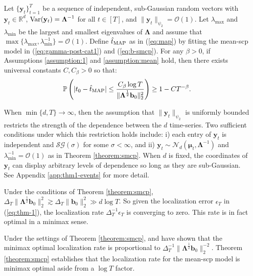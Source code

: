 \begin{theorem}\label{theorem:smcp}
    Let $\{\mathbf{y}_t\}_{t=1}^T$ be a sequence of independent, sub-Gaussian random vectors with $\mathbf{y}_t \in \mathbb{R}^d$, $\normalfont{\Var}(\mathbf{y}_t) = \boldsymbol{\Lambda}^{-1}$ for all $t \in [T]$, and $\lVert \mathbf{y}_t\rVert_{\psi_2} =\mathcal{O}(1)$. Let $\lambda_{\max}$ and $\lambda_{\min}$ be the largest and smallest eigenvalues of $\boldsymbol{\Lambda}$ and assume that $\max\{\lambda_{\max}, \lambda^{-1}_{\min}\} = \mathcal{O}(1)$. Define $\hat{t}_{\normalfont \text{MAP}}$ as in (\ref{eq:map}) by fitting the mean-scp model in (\ref{eq:gamma-post-cat1}) and (\ref{eq:b-smcp}). For any $\beta > 0$, if Assumptions \ref{assumption:1} and \ref{assumption:mean} hold, then there exists universal constants $C,C_\beta > 0$ so that:
    \vspace{-5pt}
    \begin{align}
        \Pr\left(|t_0 - \hat{t}_{\normalfont \text{MAP}}| \leq \frac{C_\beta \log T}{\lVert\boldsymbol{\Lambda}^{\frac{1}{2}}\mathbf{b}_0\rVert_2^2}\right) \geq 1-CT^{-\beta}. \label{eq:thm-1}
    \end{align}
\end{theorem}
\vspace{-5pt}

\begin{remark}\label{rmk:sub-g}
    When $\min\{d,T\}\to\infty$, then the assumption that $\lVert \mathbf{y}_t\rVert_{\psi_2}$ is uniformly bounded restricts the strength of the dependence between the $d$ time-series. Two sufficient conditions under which this restriction holds include: i) each entry of $\mathbf{y}_t$ is independent and $\mathcal{SG}(\sigma)$ for some $\sigma < \infty$, and ii) $\mathbf{y}_t \sim \mathcal{N}_d(\boldsymbol{\mu}_t, \boldsymbol{\Lambda}^{-1})$ and $\lambda^{-1}_{\min} = \mathcal{O}(1)$ as in Theorem \ref{theorem:smcp}. When $d$ is fixed, the coordinates of $\mathbf{y}_t$ can display arbitrary levels of dependence so long as they are sub-Gaussian. See Appendix \ref{app:thm1-events} for more detail.
\end{remark}
\vspace{-5pt}
Under the conditions of Theorem \ref{theorem:smcp}, $\Delta_T\lVert\boldsymbol{\Lambda}^{\frac{1}{2}}\mathbf{b}_0\rVert_2^2 \gtrsim \Delta_T\lVert\mathbf{b}_0\rVert_2^2 \gg d\log T$. So given the localization error $\epsilon_T$ in (\ref{eq:thm-1}), the localization rate $\Delta_T^{-1}\epsilon_T$ is converging to zero. This rate is in fact optimal in a minimax sense.
\begin{remark}\label{rmk:thm-1-minimax}
    Under the settings of Theorem \ref{theorem:smcp}, \cite{Wang17} and \cite{Wang2020_localization} have shown that the minimax optimal localization rate is proportional to $\Delta^{-1}_T\lVert\boldsymbol{\Lambda}^{\frac{1}{2}}\mathbf{b}_0\rVert_2^{-2}$. Theorem \ref{theorem:smcp} establishes that the localization rate for the mean-scp model is minimax optimal aside from a $\log T$ factor. 
\end{remark}
\vspace{-5pt}

